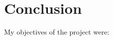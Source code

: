 \documentclass[
    author={Kai Hulme},
    supervisor={Dr Jon Bird},
    degree={BSc},
    title={Generative Adversarial Networks as an Augmentation Technique},
    subtitle={for Alzheimer's Disease Detection in MRI Volumes},
    type={Research},
    year={2021} 
]{dissertation}
\begin{document}




\chapter{Conclusion}
\label{chap:conclusion}



My objectives of the project were:
 
\end{document}
